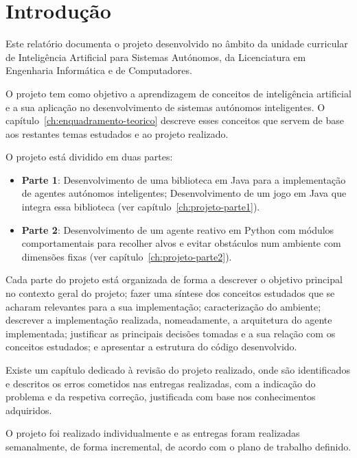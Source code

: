 \chapter{Introdução}\label{ch:introducao}

Este relatório documenta o projeto desenvolvido no âmbito da unidade curricular de Inteligência Artificial para Sistemas Autónomos, da Licenciatura em Engenharia Informática e de Computadores.

O projeto tem como objetivo a aprendizagem de conceitos de inteligência artificial e a sua aplicação no desenvolvimento de sistemas autónomos inteligentes.
O capítulo~\ref{ch:enquadramento-teorico} descreve esses conceitos que servem de base aos restantes temas estudados e ao projeto realizado.

O projeto está dividido em duas partes:
\begin{itemize}
    \item \textbf{Parte 1}: Desenvolvimento de uma biblioteca em Java para a implementação de agentes autónomos inteligentes; Desenvolvimento de um jogo em Java que integra essa biblioteca (ver capítulo~\ref{ch:projeto-parte1}).
    \item \textbf{Parte 2}: Desenvolvimento de um agente reativo em Python com módulos comportamentais para recolher alvos e evitar obstáculos num ambiente com dimensões fixas (ver capítulo~\ref{ch:projeto-parte2}).
\end{itemize}

Cada parte do projeto está organizada de forma a descrever o objetivo principal no contexto geral do projeto; fazer uma síntese dos conceitos estudados que se acharam relevantes para a sua implementação; caracterização do ambiente; descrever a implementação realizada, nomeadamente, a arquitetura do agente implementada; justificar as principais decisões tomadas e a sua relação com os conceitos estudados; e apresentar a estrutura do código desenvolvido.

Existe um capítulo dedicado à revisão do projeto realizado, onde são identificados e descritos os erros cometidos nas entregas realizadas, com a indicação do problema e da respetiva correção, justificada com base nos conhecimentos adquiridos.

O projeto foi realizado individualmente e as entregas foram realizadas semanalmente, de forma incremental, de acordo com o plano de trabalho definido.
